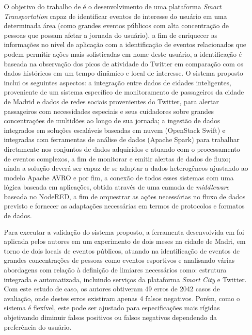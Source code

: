 \documentclass[ti,table]{texufpel} %
\begin{document}
     O objetivo do trabalho de \cite{art9kousiouris2018integrated} é o desenvolvimento de uma plataforma \textit{Smart Transportation} capaz de identificar eventos de interesse do usuário em uma determinada área (como grandes eventos públicos com alta concentração de pessoas que possam afetar a jornada do usuário), a fim de enriquecer as informações no nível de aplicação com a identificação de eventos relacionados que podem permitir ações mais sofisticadas em nome deste usuário, a identificação é baseada na observação dos picos de atividade do Twitter em comparação com os dados históricos em um tempo dinâmico e local de interesse. O sistema proposto inclui os seguintes aspectos: a integração entre dados de cidades inteligentes, proveniente de um sistema específico de monitoramento de passageiros da cidade de Madrid e dados de redes sociais provenientes do Twitter, para alertar passageiros com necessidades especiais e seus cuidadores sobre grandes concentrações de multidões ao longo de sua jornada; a ingestão de dados integrados em soluções escaláveis baseadas em nuvem (OpenStack Swift) e integradas com ferramentas de análise de dados (Apache Spark) para trabalhar diretamente nos conjuntos de dados adquiridos e atuando com o processamento de eventos complexos, a fim de monitorar e emitir alertas de dados de fluxo; ainda a solução deverá ser capaz de se adaptar a dados heterogêneos ajustando ao modelo Apache AVRO e por fim, a conexão de todos esses sistemas com uma lógica baseada em aplicações, obtida através de uma camada de \textit{middleware} baseada no NodeRED, a fim de orquestrar as ações necessárias no fluxo de dados previsto e fornecer as adaptações necessárias em termos de protocolos e formatos de dados.     

     

     Para executar a validação do sistema proposto, a ferramenta desenvolvida em \cite{art9kousiouris2018integrated} foi aplicada pelos autores em um experimento de dois meses na cidade de Madri, em torno de dois locais de eventos públicos, atuando na identificação de eventos de grandes concentrações de pessoas como eventos esportivos e analisando várias abordagens com relação à definição de limiares necessários como: estrutura integrada e automatizada, incluindo serviços da plataforma \textit{Smart City} e Twitter. Com este estudo de caso, os autores obtiveram 49 erros de 2042 casos de avaliação, onde destes erros existiram apenas 4 falsos negativos. Porém, como o sistema é flexível, este pode ser ajustado para especificações mais rígidas objetivando diminuir falsos positivos ou falsos negativos dependendo da preferência do usuário. 
\end{document}

